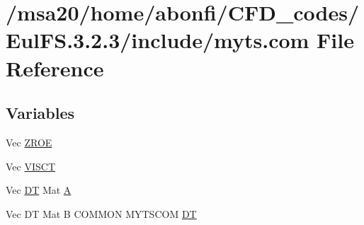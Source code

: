 \hypertarget{msa20_2home_2abonfi_2_c_f_d__codes_2_eul_f_s_83_82_83_2include_2myts_8com}{\section{/msa20/home/abonfi/\-C\-F\-D\-\_\-codes/\-Eul\-F\-S.3.2.3/include/myts.com File Reference}
\label{msa20_2home_2abonfi_2_c_f_d__codes_2_eul_f_s_83_82_83_2include_2myts_8com}
}
\subsection*{Variables}
\begin{DoxyCompactItemize}
\item 
Vec \hyperlink{msa20_2home_2abonfi_2_c_f_d__codes_2_eul_f_s_83_82_83_2include_2myts_8com_a0c4fbcdb78e6b50c8919d714e4b5a694}{Z\-R\-O\-E}
\item 
Vec \hyperlink{msa20_2home_2abonfi_2_c_f_d__codes_2_eul_f_s_83_82_83_2include_2myts_8com_accf7addb2159476a2ff0ba7d99b8bbbc}{V\-I\-S\-C\-T}
\item 
Vec \hyperlink{msa20_2home_2abonfi_2_c_f_d__codes_2_eul_f_s_83_82_83_2include_2myts_8com_a41549d5ede5e2b840495daf35608da41}{D\-T} Mat \hyperlink{msa20_2home_2abonfi_2_c_f_d__codes_2_eul_f_s_83_82_83_2include_2myts_8com_a04f74f75c95694d7f2517b1ad1bb88fc}{A}
\item 
Vec D\-T Mat B C\-O\-M\-M\-O\-N M\-Y\-T\-S\-C\-O\-M \hyperlink{msa20_2home_2abonfi_2_c_f_d__codes_2_eul_f_s_83_82_83_2include_2myts_8com_a41549d5ede5e2b840495daf35608da41}{D\-T}
\end{DoxyCompactItemize}


